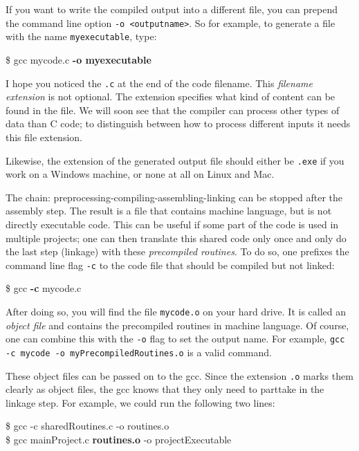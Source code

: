 If you want to write the compiled output into a different file, you can prepend the command line option \texttt{-o <outputname>}. So for example, to generate a file with the name \texttt{myexecutable}, type:
\begin{cmdbox}
\$ gcc mycode.c \textbf{-o myexecutable}
\end{cmdbox}

\begin{warnbox}
I hope you noticed the \texttt{.c} at the end of the code filename. This \emph{filename extension} is not optional. The extension specifies what kind of content can be found in the file. We will soon see that the compiler can process other types of data than C code; to distinguish between how to process different inputs it needs this file extension.

Likewise, the extension of the generated output file should either be \texttt{.exe} if you work on a Windows machine, or none at all on Linux and Mac.
\end{warnbox}

The chain: preprocessing-compiling-assembling-linking can be stopped after the assembly step. The result is a file that contains machine language, but is not directly executable code. This can be useful if some part of the code is used in multiple projects; one can then translate this shared code only once and only do the last step (linkage) with these \emph{precompiled routines}. To do so, one prefixes the command line flag \texttt{-c} to the code file that should be compiled but not linked:
\begin{cmdbox}
\$ gcc \textbf{-c} mycode.c
\end{cmdbox}

After doing so, you will find the file \texttt{mycode.o} on your hard drive. It is called an \emph{object file} and contains the precompiled routines in machine language. Of course, one can combine this with the \texttt{-o} flag to set the output name. For example, \texttt{gcc -c mycode -o myPrecompiledRoutines.o} is a valid command.

These object files can be passed on to the gcc. Since the extension \texttt{.o} marks them clearly as object files, the gcc knows that they only need to parttake in the linkage step. For example, we could run the following two lines:
\begin{cmdbox}
\$ gcc -c sharedRoutines.c -o routines.o \\
\$ gcc mainProject.c \textbf{routines.o} -o projectExecutable
\end{cmdbox}

